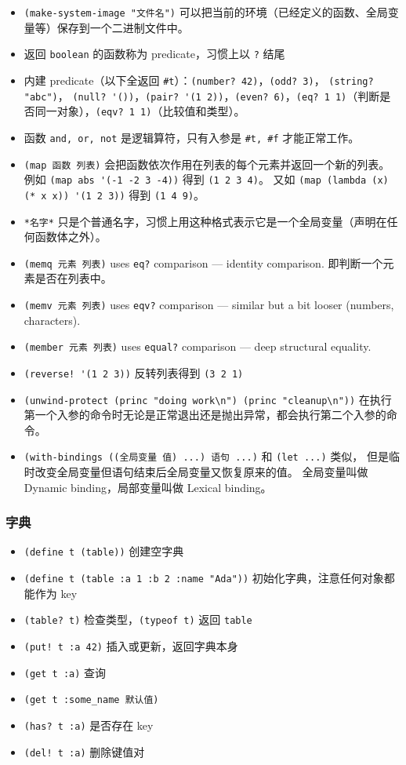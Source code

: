 \begin{itemize}
\item \verb`(make-system-image "文件名")` 可以把当前的环境（已经定义的函数、全局变量等）保存到一个二进制文件中。
\item 返回 \verb`boolean` 的函数称为 predicate，习惯上以 \verb`?` 结尾
\item 内建 predicate（以下全返回 \verb`#t`）：\verb`(number? 42)`，\verb`(odd? 3)`， \verb`(string? "abc")`， \verb`(null? '())`，\verb`(pair? '(1 2))`，\verb`(even? 6)`，\verb`(eq? 1 1)`（判断是否同一对象），\verb`(eqv? 1 1)`（比较值和类型）。
\item 函数 \verb`and, or, not` 是逻辑算符，只有入参是 \verb`#t, #f` 才能正常工作。
\item \verb`(map 函数 列表)` 会把函数依次作用在列表的每个元素并返回一个新的列表。 例如 \verb`(map abs '(-1 -2 3 -4))` 得到 \verb`(1 2 3 4)`。 又如 \verb`(map (lambda (x) (* x x)) '(1 2 3))` 得到 \verb`(1 4 9)`。
\item \verb`*名字*` 只是个普通名字，习惯上用这种格式表示它是一个全局变量（声明在任何函数体之外）。
\item \verb`(memq 元素 列表)` uses \verb`eq?` comparison — identity comparison. 即判断一个元素是否在列表中。
\item \verb`(memv 元素 列表)` uses \verb`eqv?` comparison — similar but a bit looser (numbers, characters).
\item \verb`(member 元素 列表)` uses \verb`equal?` comparison — deep structural equality.
\item \verb`(reverse! '(1 2 3))` 反转列表得到 \verb`(3 2 1)`
\item \verb`(unwind-protect (princ "doing work\n") (princ "cleanup\n"))` 在执行第一个入参的命令时无论是正常退出还是抛出异常，都会执行第二个入参的命令。
\item \verb`(with-bindings ((全局变量 值) ...) 语句 ...)` 和 \verb`(let ...)` 类似， 但是临时改变全局变量但语句结束后全局变量又恢复原来的值。 全局变量叫做 Dynamic binding，局部变量叫做 Lexical binding。
\end{itemize}

\subsubsection{字典}
\begin{itemize}
\item \verb`(define t (table))` 创建空字典
\item \verb`(define t (table :a 1 :b 2 :name "Ada"))` 初始化字典，注意任何对象都能作为 key
\item \verb`(table? t)` 检查类型，\verb`(typeof t)` 返回 \verb`table`
\item \verb`(put! t :a 42)` 插入或更新，返回字典本身
\item \verb`(get t :a)` 查询
\item \verb`(get t :some_name 默认值)` 
\item \verb`(has? t :a)` 是否存在 key
\item \verb`(del! t :a)` 删除键值对
\end{itemize}


